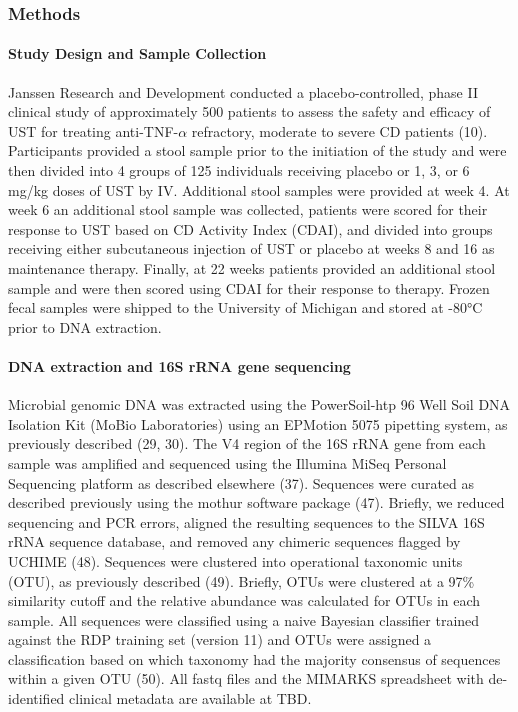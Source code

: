 \documentclass[11pt,]{article}
\let\oldparagraph\paragraph
\renewcommand{\paragraph}[1]{\oldparagraph{#1}\mbox{}}
\begin{document}
\newpage

\subsubsection{Methods}\label{methods}

\paragraph{Study Design and Sample
Collection}\label{study-design-and-sample-collection}

Janssen Research and Development conducted a placebo-controlled, phase
II clinical study of approximately 500 patients to assess the safety and
efficacy of UST for treating anti-TNF-\({\alpha}\) refractory, moderate
to severe CD patients (10). Participants provided a stool sample prior
to the initiation of the study and were then divided into 4 groups of
125 individuals receiving placebo or 1, 3, or 6 mg/kg doses of UST by
IV. Additional stool samples were provided at week 4. At week 6 an
additional stool sample was collected, patients were scored for their
response to UST based on CD Activity Index (CDAI), and divided into
groups receiving either subcutaneous injection of UST or placebo at
weeks 8 and 16 as maintenance therapy. Finally, at 22 weeks patients
provided an additional stool sample and were then scored using CDAI for
their response to therapy. Frozen fecal samples were shipped to the
University of Michigan and stored at -80°C prior to DNA extraction.

\paragraph{DNA extraction and 16S rRNA gene
sequencing}\label{dna-extraction-and-16s-rrna-gene-sequencing}

Microbial genomic DNA was extracted using the PowerSoil-htp 96 Well Soil
DNA Isolation Kit (MoBio Laboratories) using an EPMotion 5075 pipetting
system, as previously described (29, 30). The V4 region of the 16S rRNA
gene from each sample was amplified and sequenced using the Illumina
MiSeq Personal Sequencing platform as described elsewhere (37).
Sequences were curated as described previously using the mothur software
package (47). Briefly, we reduced sequencing and PCR errors, aligned the
resulting sequences to the SILVA 16S rRNA sequence database, and removed
any chimeric sequences flagged by UCHIME (48). Sequences were clustered
into operational taxonomic units (OTU), as previously described (49).
Briefly, OTUs were clustered at a 97\% similarity cutoff and the
relative abundance was calculated for OTUs in each sample. All sequences
were classified using a naive Bayesian classifier trained against the
RDP training set (version 11) and OTUs were assigned a classification
based on which taxonomy had the majority consensus of sequences within a
given OTU (50). All fastq files and the MIMARKS spreadsheet with
de-identified clinical metadata are available at TBD.
\end{document}
